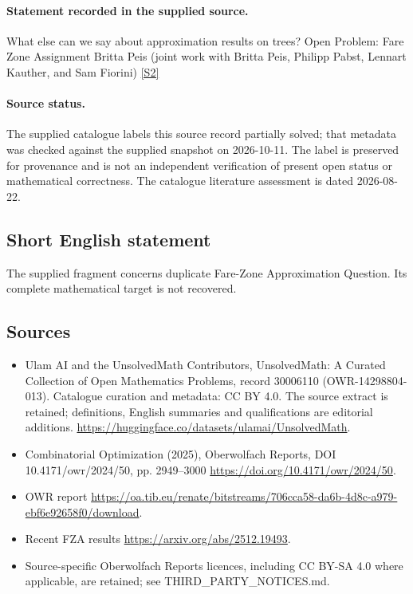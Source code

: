 \documentclass[11pt]{article}
\newcommand{\sref}[2]{\hyperlink{source:#1:#2}{[S#2]}}
\begin{document}
\paragraph{Statement recorded in the supplied source.}
What else can we say about approximation results on trees? Open Problem: Fare Zone Assignment Britta Peis (joint work with Britta Peis, Philipp Pabst, Lennart Kauther, and Sam Fiorini) \sref{30006110}{2}
\paragraph{Source status.}
The supplied catalogue labels this source record partially solved; that metadata was checked against the supplied snapshot on 2026-10-11. The label is preserved for provenance and is not an independent verification of present open status or mathematical correctness. The catalogue literature assessment is dated 2026-08-22.
\subsection{Short English statement}
The supplied fragment concerns duplicate Fare-Zone Approximation Question. Its complete mathematical target is not recovered.
\subsection{Sources}
\begin{itemize}
\item[\hypertarget{source:30006110:1}{S1}] Ulam AI and the UnsolvedMath Contributors, UnsolvedMath: A Curated Collection of Open Mathematics Problems, record 30006110 (OWR-14298804-013). Catalogue curation and metadata: CC BY 4.0. The source extract is retained; definitions, English summaries and qualifications are editorial additions.
\url{https://huggingface.co/datasets/ulamai/UnsolvedMath}.
\item[\hypertarget{source:30006110:2}{S2}] Combinatorial Optimization (2025), Oberwolfach Reports, DOI 10.4171/owr/2024/50, pp. 2949--3000
\url{https://doi.org/10.4171/owr/2024/50}.
\item[\hypertarget{source:30006110:3}{S3}] OWR report
\url{https://oa.tib.eu/renate/bitstreams/706cca58-da6b-4d8c-a979-ebf6e92658f0/download}.
\item[\hypertarget{source:30006110:4}{S4}] Recent FZA results
\url{https://arxiv.org/abs/2512.19493}.
\item Source-specific Oberwolfach Reports licences, including CC BY-SA 4.0 where applicable, are retained; see THIRD\_PARTY\_NOTICES.md.
\end{itemize}
\end{document}
